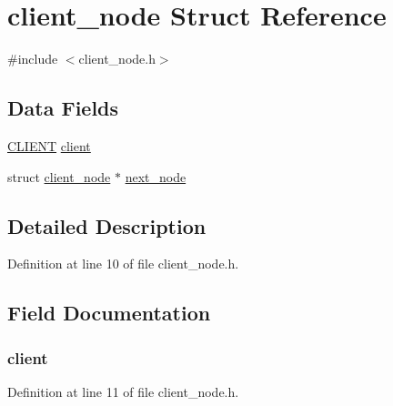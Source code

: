 \hypertarget{structclient__node}{}\section{client\+\_\+node Struct Reference}
\label{structclient__node}


{\ttfamily \#include $<$client\+\_\+node.\+h$>$}

\subsection*{Data Fields}
\begin{DoxyCompactItemize}
\item 
\hyperlink{client_8h_a5b9629cfae95f0660c94fb7bde7a6a15}{C\+L\+I\+E\+N\+T} \hyperlink{structclient__node_a1cc7c2cbe4688ea8d30bd089c2b0c5ad}{client}
\item 
struct \hyperlink{structclient__node}{client\+\_\+node} $\ast$ \hyperlink{structclient__node_a14ec8f63442dc76813a428c8c762a3a9}{next\+\_\+node}
\end{DoxyCompactItemize}


\subsection{Detailed Description}


Definition at line 10 of file client\+\_\+node.\+h.



\subsection{Field Documentation}
\hypertarget{structclient__node_a1cc7c2cbe4688ea8d30bd089c2b0c5ad}{}
\subsubsection[{client}]{ {\bf client}}\label{structclient__node_a1cc7c2cbe4688ea8d30bd089c2b0c5ad}


Definition at line 11 of file client\+\_\+node.\+h.

\hypertarget{structclient__node_a14ec8f63442dc76813a428c8c762a3a9}{}
